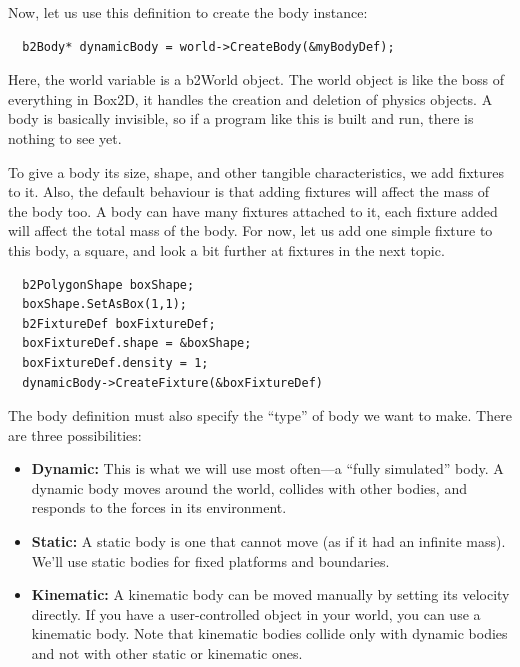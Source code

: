 \documentclass[main]{subfiles}
\begin{document}
Now, let us use this definition to create the body instance: 
\begin{verbatim}
  b2Body* dynamicBody = world->CreateBody(&myBodyDef);
\end{verbatim}

Here, the world variable is a b2World object. The world object is like the boss of everything in Box2D, it handles the creation and deletion of physics objects. A body is basically invisible, so if a program like this is built and run, there is nothing to see yet.

To give a body its size, shape, and other tangible characteristics, we add fixtures to it. Also, the default behaviour is that adding fixtures will affect the mass of the body too. A body can have many fixtures attached to it, each fixture added will affect the total mass of the body. For now, let us add one simple fixture to this body, a square, and look a bit further at fixtures in the next topic. 
  \begin{verbatim}
  b2PolygonShape boxShape;
  boxShape.SetAsBox(1,1);
  b2FixtureDef boxFixtureDef;
  boxFixtureDef.shape = &boxShape;
  boxFixtureDef.density = 1;
  dynamicBody->CreateFixture(&boxFixtureDef)
  \end{verbatim}
  
  The body definition must also specify the “type” of body we want to make. There are three possibilities:

\begin{itemize}
    \item \textbf{Dynamic:} This is what we will use most often—a “fully simulated” body. A dynamic body moves around the world, collides with other bodies,        and responds to the forces in its environment.

    \item \textbf{Static:} A static body is one that cannot move (as if it had an infinite mass). We’ll use static bodies for fixed platforms and boundaries.

    \item \textbf{Kinematic:} A kinematic body can be moved manually by setting its velocity directly. If you have a user-controlled object in your world, you can use a kinematic body. Note that kinematic bodies collide only with dynamic bodies and not with other static or kinematic ones.
\end{itemize}
\end{document}
